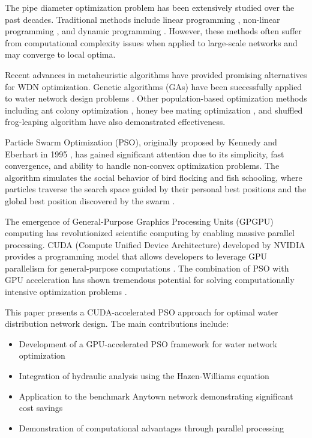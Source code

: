 \documentclass[conference]{IEEEtran}
\begin{document}
The pipe diameter optimization problem has been extensively studied over the past decades. Traditional methods include linear programming \cite{chesani1978optimal}, non-linear programming \cite{lansey1989optimal}, and dynamic programming \cite{fujiwara1990improved}. However, these methods often suffer from computational complexity issues when applied to large-scale networks and may converge to local optima.

Recent advances in metaheuristic algorithms have provided promising alternatives for WDN optimization. Genetic algorithms (GAs) have been successfully applied to water network design problems \cite{saad1996genetic,murphy1999genetic}. Other population-based optimization methods including ant colony optimization \cite{maier2003ant}, honey bee mating optimization \cite{montes2009optimal}, and shuffled frog-leaping algorithm \cite{mohan2009multi} have also demonstrated effectiveness.

Particle Swarm Optimization (PSO), originally proposed by Kennedy and Eberhart in 1995 \cite{kennedy1995particle}, has gained significant attention due to its simplicity, fast convergence, and ability to handle non-convex optimization problems. The algorithm simulates the social behavior of bird flocking and fish schooling, where particles traverse the search space guided by their personal best positions and the global best position discovered by the swarm \cite{eberhart2001particle}.

The emergence of General-Purpose Graphics Processing Units (GPGPU) computing has revolutionized scientific computing by enabling massive parallel processing. CUDA (Compute Unified Device Architecture) developed by NVIDIA provides a programming model that allows developers to leverage GPU parallelism for general-purpose computations \cite{nickolls2008scaleJ}. The combination of PSO with GPU acceleration has shown tremendous potential for solving computationally intensive optimization problems \cite{veronese2010particle,liang2013gpu}.

This paper presents a CUDA-accelerated PSO approach for optimal water distribution network design. The main contributions include:
\begin{itemize}
\item Development of a GPU-accelerated PSO framework for water network optimization
\item Integration of hydraulic analysis using the Hazen-Williams equation
\item Application to the benchmark Anytown network demonstrating significant cost savings
\item Demonstration of computational advantages through parallel processing
\end{itemize}
\end{document}
